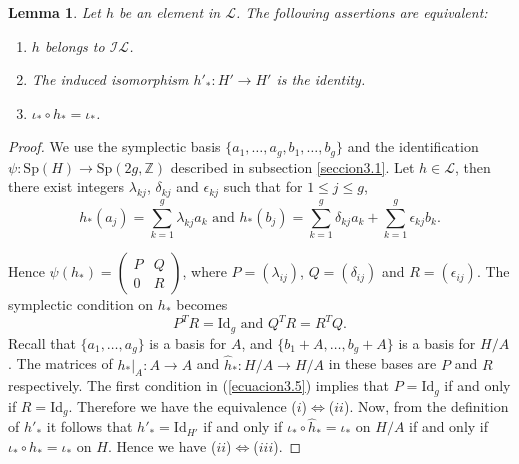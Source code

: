 \documentclass[10pt]{amsart}
\numberwithin{equation}{section}
\numberwithin{equation}{section}
\newtheorem{lemma}[theorem]{Lemma}
\theoremstyle{definition}
\begin{document}
\begin{lemma}\label{lema3.1} Let $h$ be an element in $\mathcal{L}$. The following assertions are equivalent:
\begin{enumerate}
\item[\emph{(\emph{i})}] $h$ belongs to $\mathcal{IL}$.
\item[\emph{(\emph{ii})}] The induced isomorphism $h'_*:H'\rightarrow H'$ is the identity.
\item[\emph{(\emph{iii})}] $\iota_*\circ h_*=\iota_*$.
\end{enumerate}
\end{lemma} 

\begin{proof}
We use the symplectic basis $\{a_1,\ldots,a_g, b_1, \ldots, b_g\}$ and the  identification  $\psi: \text{Sp}(H)\rightarrow \text{Sp}(2g,\mathbb{Z})$ described in subsection \ref{seccion3.1}. Let  $h\in\mathcal{L}$, then there exist integers $\lambda_{kj}$, $\delta_{kj}$ and $\epsilon_{kj}$   such that for  $1\leq j \leq g$,  
\begin{equation}\label{ecuacionlema}
h_{*}(a_j)=\sum_{k=1}^g \lambda_{kj}a_k  \text{\ \ \ \ \ \ \ and \ \ \ \ \ \ }  h_{*}(b_j)=\sum_{k=1}^g \delta_{kj}a_k + \sum_{k=1}^g \epsilon_{kj}b_k.
\end{equation}

\noindent Hence  $\psi(h_{*})=\left( \begin{smallmatrix} P & Q\\ 0 & R \end{smallmatrix} \right)$, where $P=(\lambda_{ij})$, $Q=(\delta_{ij})$ and $R=(\epsilon_{ij})$. The symplectic condition on $h_{*}$ becomes
\begin{equation}\label{ecuacion3.5}
P^TR=\text{Id}_g  \text{\ \ \ \ \ \ \ and \ \ \ \ \ \ } Q^TR=R^TQ.
\end{equation}
\noindent Recall that $\{a_1,\ldots,a_g\}$ is a basis for $A$, and $\{b_1+A,\ldots, b_g+A\}$ is a basis for $H/A$. The matrices of $h_{*}|_A:A\rightarrow A$ and $\hat{h}_*:H/A\rightarrow H/A$ in these bases are $P$ and $R$ respectively. The first condition in  (\ref{ecuacion3.5}) implies that $P=\text{Id}_g$ if and only if $R=\text{Id}_g$. Therefore we have the equivalence ($i$)$\Leftrightarrow$($ii$). Now, from the definition of $h'_*$  it follows that  $h'_*=\text{Id}_{H'}$ if and only if $\iota_*\circ \hat{h}_*=\iota_*$ on $H/A$ if and only if $\iota_*\circ h_*=\iota_*$ on $H$. Hence we have ($ii$)$\Leftrightarrow$($iii$).
\end{proof}
\end{document}

